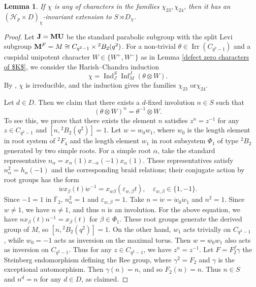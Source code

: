 \documentclass[11pt,a4paper]{article}
\numberwithin{equation}{section}
\newtheorem{lemma}[theorem]{Lemma}
\theoremstyle{definition}
\theoremstyle{remark}
\newcommand{\Irr}{\operatorname{Irr}}
\newcommand{\Inf}{\operatorname{Inf}}
\newcommand{\HH}{\mathcal H}
\newcommand{\Ind}{\operatorname{Ind}}
\begin{document}
\begin{lemma}\label{lem: The split Suzuki Levi families}
If $\chi$ is any of characters in the families 
$\chi_{23},\chi_{24}$, then it has an $(\HH_p\times D)_\chi$-invariant extension to $S\rtimes D_\chi$.  
\end{lemma}
\begin{proof}
Let ${\bf J=MU}$ be the standard parabolic subgroup with the split Levi subgroup ${\bf M}^F=M\cong C_{q^2-1}\times{}^2B_2(q^2)$. 
For a non-trivial $\theta\in\Irr(C_{q^2-1})$ and a cuspidal unipotent character $W\in\{W^+,W^-\}$ as in Lemma \ref{defect zero characters of $K$}, we consider the Harish--Chandra induction
\begin{equation}\label{eq:hc}
 \chi=\Ind_{J}^S\Inf_M^{J}(\theta\otimes W).
\end{equation}
By \cite[Proposition~10.4(1), its proof, and Table~1]{HHM},
$\chi$ is irreducible, and the induction gives the families $\chi_{23}$ or$\chi_{24}$.

Let $d\in D$. Then we claim that there exists a $d$-fixed involution $n\in S$ such that 
\begin{equation}\label{eq: act}
(\theta\otimes W)^n=\theta^{-1}\otimes W.   
\end{equation}
To see this,
we prove that there exists the element $n$ satisfies $z^n=z^{-1}$ for any $z\in C_{q^2-1}$ and $[n,{}^2B_2(q^2)]=1$.
Let $w=w_0w_1$, where $w_0$ is the length element in root system of \({}^2F_4\) and the length element \(w_1\) in root subsystem $\Phi_1$ of type ${}^2B_2$ generated by two simple roots.  For a simple root $\alpha$, take the standard representative $n_\alpha = x_\alpha(1)x_{-\alpha}(-1)x_\alpha(1)$.
These representatives satisfy $n_\alpha^2 = h_\alpha(-1)$ and the corresponding braid relations; their conjugate action by root groups has the form
$$\dot{w}x_\beta(t)\dot{w}^{-1}=x_{w\beta}(\varepsilon_{w,\beta}t),\quad \varepsilon_{w,\beta}\in\{1,-1\}.$$ 
Since $-1=1$ in $\overline{\mathbb{F}}_2$, 
$n_\alpha^2=1$ and $ \varepsilon_{w,\beta}=1$.
Take $n=\dot{w}=\dot{w}_0\dot{w}_1$ and $n^2=1.$
Since $w\neq 1$, we have $n\neq 1$, and thus $n$ is an involution. For the above equation, we have 
$n x_\beta(t)n^{-1}=x_\beta(t)$ for $\beta\in\Phi_1$.  
These root groups generate the derived group of $M$, so $[n,{}^2B_2(q^2)]=1$. On the other hand, \(w_1\) acts trivially on $C_{q^2-1}$, while \(w_0=-1\) acts as inversion on the  maximal torus. Then \(w=w_0w_1\) also acts as inversion on $C_{q^2-1}$.  Thus for any $z\in C_{q^2-1}$, we have 
$z^n=z^{-1}$.  Let $F=F_2^f\gamma$ the Steinberg endomorphism defining the Ree group, where $\gamma^2=F_2$ and \(\gamma\) is the exceptional automorphism. Then $\gamma(n)=n$, and so $F_2(n)=n$. Thus
$n\in S$ and $n^d=n$ for any $d\in D$, as claimed.


\end{proof}
\end{document}

